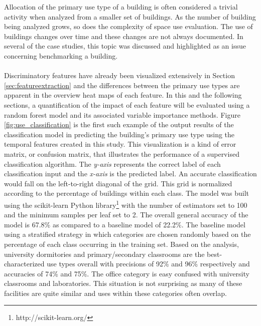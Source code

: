 Allocation of the primary use type of a building is often considered a trivial activity when analyzed from a smaller set of buildings. As the number of building being analyzed grows, so does the complexity of space use evaluation. The use of buildings changes over time and these changes are not always documented. In several of the case studies, this topic was discussed and highlighted as an issue concerning benchmarking a building.\\
\\
Discriminatory features have already been visualized extensively in Section \ref{sec:featureextraction} and the differences between the primary use types are apparent in the overview heat maps of each feature. In this and the following sections, a quantification of the impact of each feature will be evaluated using a random forest model and its associated variable importance methods. Figure \ref{fig:use_classification} is the first such example of the output results of the classification model in predicting the building's primary use type using the temporal features created in this study. This visualization is a kind of error matrix, or confusion matrix, that illustrates the performance of a supervised classification algorithm. The \emph{y-axis} represents the correct label of each classification input and the \emph{x-axis} is the predicted label. An accurate classification would fall on the left-to-right diagonal of the grid. This grid is normalized according to the percentage of buildings within each class. The model was built using the scikit-learn Python library\footnote{http://scikit-learn.org/} with the number of estimators set to 100 and the minimum samples per leaf set to 2. The overall general accuracy of the model is 67.8\% as compared to a baseline model of 22.2\%. The baseline model using a stratified strategy in which categories are chosen randomly based on the percentage of each class occurring in the training set. Based on the analysis, university dormitories and primary/secondary classrooms are the best-characterized use types overall with precisions of 92\% and 96\% respectively and accuracies of 74\% and 75\%. The office category is easy confused with university classrooms and laboratories. This situation is not surprising as many of these facilities are quite similar and uses within these categories often overlap. 


